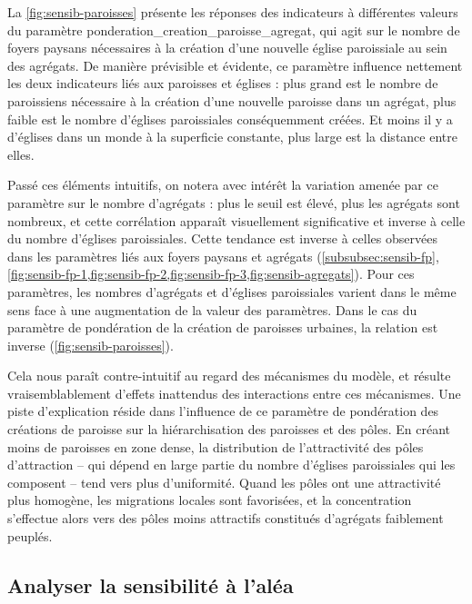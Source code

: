 La \cref{fig:sensib-paroisses} présente les réponses des indicateurs à différentes valeurs du paramètre \textsf{ponderation\_creation\_paroisse\_agregat}, qui agit sur le nombre de foyers paysans nécessaires à la création d'une nouvelle église paroissiale au sein des agrégats.
De manière prévisible et évidente, ce paramètre influence nettement les deux indicateurs liés aux paroisses et églises :
	plus grand est le nombre de paroissiens nécessaire à la création d'une nouvelle paroisse dans un agrégat, plus faible est le nombre d'églises paroissiales conséquemment créées.
Et moins il y a d'églises dans un monde à la superficie constante, plus large est la distance entre elles.

Passé ces éléments intuitifs, on notera avec intérêt la variation amenée par ce paramètre sur le nombre d'agrégats : plus le seuil est élevé, plus les agrégats sont nombreux, et cette corrélation apparaît visuellement significative et inverse à celle du nombre d'églises paroissiales.
Cette tendance est inverse à celles observées dans les paramètres liés aux foyers paysans et agrégats (\cref{subsubsec:sensib-fp}, \cref{fig:sensib-fp-1,fig:sensib-fp-2,fig:sensib-fp-3,fig:sensib-agregats}).
Pour ces paramètres, les nombres d'agrégats et d'églises paroissiales varient dans le même sens face à une augmentation de la valeur des paramètres.
Dans le cas du paramètre de pondération de la création de paroisses \og urbaines\fg{}, la relation est inverse (\cref{fig:sensib-paroisses}).

Cela nous paraît contre-intuitif au regard des mécanismes du modèle, et résulte vraisemblablement d'effets inattendus des interactions entre ces mécanismes.
Une piste d'explication réside dans l'influence de ce paramètre de pondération des créations de paroisse sur la hiérarchisation des paroisses et des pôles.
En créant moins de paroisses en zone dense, la distribution de l'attractivité des pôles d'attraction -- qui dépend en large partie du nombre d'églises paroissiales qui les composent -- tend vers plus d'uniformité.
Quand les pôles ont une attractivité plus homogène, les migrations locales sont favorisées, et la concentration s'effectue alors vers des pôles moins attractifs constitués d'agrégats faiblement peuplés.

\subsection{Analyser la sensibilité à l'aléa \label{subsec:sensibilite-alea}}

